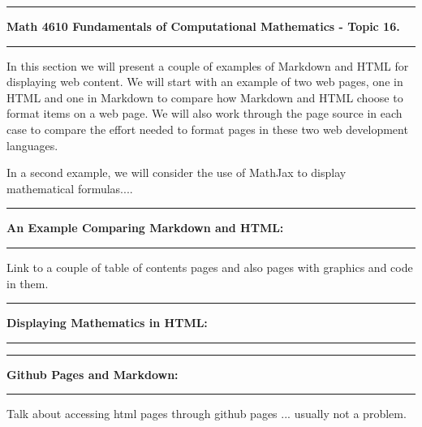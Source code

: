 \documentclass[10pt,fleqn]{article}
\begin{document}
\vskip0.1in\hrule\vskip0.1in \noindent
{\bf Math 4610 Fundamentals of Computational Mathematics  - Topic 16.}
\vskip0.1in\hrule\vskip0.1in \noindent
In this section we will present a couple of examples of Markdown and HTML for
displaying web content. We will start with an example of two web pages, one in
HTML and one in Markdown to compare how Markdown and HTML choose to format items
on a web page. We will also work through the page source in each case to compare
the effort needed to format pages in these two web development languages.

In a second example, we will consider the use of MathJax to display mathematical
formulas....
\vskip0.1in\hrule\vskip0.1in \noindent
{\bf An Example Comparing Markdown and HTML:}
\vskip0.1in\hrule\vskip0.1in \noindent

Link to a couple of table of contents pages and also pages with graphics and
code in them.


\vskip0.1in\hrule\vskip0.1in \noindent
{\bf Displaying Mathematics in HTML:}
\vskip0.1in\hrule\vskip0.1in \noindent
\vskip0.1in\hrule\vskip0.1in \noindent
{\bf Github Pages and Markdown:}
\vskip0.1in\hrule\vskip0.1in \noindent
Talk about accessing html pages through github pages ... usually not a problem.
\end{document}
